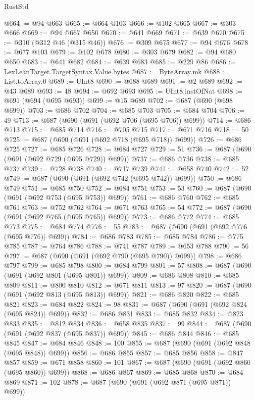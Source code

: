 \begin{lexlean}{RustStd}
\begin{coremodule}
{\begin{coremodule}
{{{{{{{{{{{{{{{{{{{{{{{{{{{{{{{{{{{{{@664 := @94 @663
@665 := @664 @103
@666 := @102 @665
@667 := @303 @666
@669 := @94 @667 @650
@670 := @641 @669
@671 := @639 @670
@675 := @310 (@312 @46 (@315 @46))
@676 := @309 @675
@677 := @94 @676
@678 := @677 @103
@679 := @102 @678
@680 := @303 @679
@682 := @94 @680 @650
@683 := @641 @682
@684 := @639 @683
@685 := @229 @86
@686 := LexLeanTarget.TargetSyntax.Value.bytes
@687 := ByteArray.mk
@688 := List.toArray.{0}
@689 := UInt8
@690 := @688 @689
@691 := @2 @689
@692 := @43 @689
@693 := 48
@694 := @692 @693
@695 := UInt8.instOfNat
@698 := @691 (@694 (@695 @693))
@699 := @15 @689
@702 := @687 (@690 (@698 @699))
@703 := @686 @702
@704 := @685 @703
@705 := @684 @704
@706 := 49
@713 := @687 (@690 (@691 (@692 @706 (@695 @706)) @699))
@714 := @686 @713
@715 := @685 @714
@716 := @705 @715
@717 := @671 @716
@718 := 50
@725 := @687 (@690 (@691 (@692 @718 (@695 @718)) @699))
@726 := @686 @725
@727 := @685 @726
@728 := @684 @727
@729 := 51
@736 := @687 (@690 (@691 (@692 @729 (@695 @729)) @699))
@737 := @686 @736
@738 := @685 @737
@739 := @728 @738
@740 := @717 @739
@741 := @658 @740
@742 := 52
@749 := @687 (@690 (@691 (@692 @742 (@695 @742)) @699))
@750 := @686 @749
@751 := @685 @750
@752 := @684 @751
@753 := 53
@760 := @687 (@690 (@691 (@692 @753 (@695 @753)) @699))
@761 := @686 @760
@762 := @685 @761
@763 := @752 @762
@764 := @671 @763
@765 := 54
@772 := @687 (@690 (@691 (@692 @765 (@695 @765)) @699))
@773 := @686 @772
@774 := @685 @773
@775 := @684 @774
@776 := 55
@783 := @687 (@690 (@691 (@692 @776 (@695 @776)) @699))
@784 := @686 @783
@785 := @685 @784
@786 := @775 @785
@787 := @764 @786
@788 := @741 @787
@789 := @653 @788
@790 := 56
@797 := @687 (@690 (@691 (@692 @790 (@695 @790)) @699))
@798 := @686 @797
@799 := @685 @798
@800 := @684 @799
@801 := 57
@808 := @687 (@690 (@691 (@692 @801 (@695 @801)) @699))
@809 := @686 @808
@810 := @685 @809
@811 := @800 @810
@812 := @671 @811
@813 := 97
@820 := @687 (@690 (@691 (@692 @813 (@695 @813)) @699))
@821 := @686 @820
@822 := @685 @821
@823 := @684 @822
@824 := 98
@831 := @687 (@690 (@691 (@692 @824 (@695 @824)) @699))
@832 := @686 @831
@833 := @685 @832
@834 := @823 @833
@835 := @812 @834
@836 := @658 @835
@837 := 99
@844 := @687 (@690 (@691 (@692 @837 (@695 @837)) @699))
@845 := @686 @844
@846 := @685 @845
@847 := @684 @846
@848 := 100
@855 := @687 (@690 (@691 (@692 @848 (@695 @848)) @699))
@856 := @686 @855
@857 := @685 @856
@858 := @847 @857
@859 := @671 @858
@860 := 101
@867 := @687 (@690 (@691 (@692 @860 (@695 @860)) @699))
@868 := @686 @867
@869 := @685 @868
@870 := @684 @869
@871 := 102
@878 := @687 (@690 (@691 (@692 @871 (@695 @871)) @699))
}}}}}}}}}}}}}}}}}}}}}}}}}}}}}}}}}}}}}
\end{coremodule}}
\end{coremodule}
\end{lexlean}
